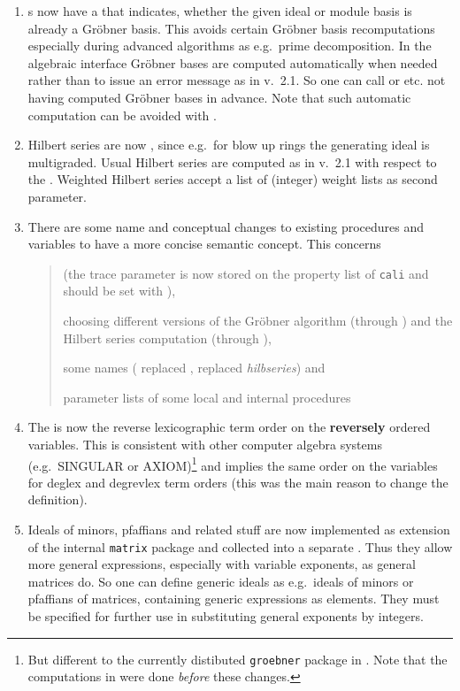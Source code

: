 \begin{enumerate}
\item {}s now have a  that indicates, whether the
given ideal or module basis is already a Gr\"obner basis. This avoids
certain Gr\"obner basis recomputations especially during advanced algorithms
as e.g.\ prime decomposition. In the algebraic interface Gr\"obner bases are
computed automatically when needed rather than to issue an error
message as in v.~2.1. So one can call  or 
etc. not having computed Gr\"obner bases in advance. Note that such
automatic computation can be avoided with .

\item Hilbert series are now , since
e.g.\ for blow up rings the generating ideal is multigraded. Usual
Hilbert series are computed as in v.~2.1 with respect to the
. Weighted Hilbert series accept a list of (integer)
weight lists as second parameter.

\item There are some name and conceptual changes to existing
procedures and variables to have a more concise semantic concept. This
concerns
\begin{quote}
 (the trace parameter is now stored on the property list
of \texttt{cali} and should be set with ),

choosing different versions of the Gr\"obner algorithm (through
) and the Hilbert series computation (through
),

some names ( replaced , 
replaced \emph{hilbseries}) and

parameter lists of some local and internal procedures %
\end{quote}

\item The  is now the reverse lexicographic
term order on the \textbf{reversely} ordered variables. This is consistent
with other computer algebra systems (e.g.\ SINGULAR or
AXIOM)\footnote{But different to the currently distibuted \texttt{groebner} package in \REDUCE. Note that the computations in
\cite{Graebe:94a} were done \emph{before} these changes.} and implies the same
order on the variables for deglex and degrevlex term orders (this was
the main reason to change the definition).

\item Ideals of minors, pfaffians and related stuff are now
implemented as extension of the internal \texttt{matrix} package and
collected into a separate . Thus they allow more
general expressions, especially with variable exponents, as general
\REDUCE matrices do. So one can define generic ideals as e.g.\ ideals
of minors or pfaffians of matrices, containing generic expressions as
elements. They must be specified for further use in  substituting
general exponents by integers.

\end{enumerate}

